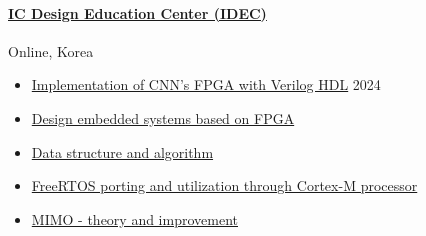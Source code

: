 \documentclass[a4paper,9pt]{extarticle}
\begin{document}
\paragraph{\large{\href{https://www.idec.or.kr/main/}{IC Design Education Center (IDEC)}}}  \hfill Online, Korea
\begin{itemize}
    \item \href{https://github.com/user-attachments/assets/234ad610-a051-4140-9f20-48ca4d8e4d42}{Implementation of CNN's FPGA with Verilog HDL}                         \hfill 2024
    \item \href{https://github.com/user-attachments/assets/68b0ae05-462b-4750-93ba-1bc4072dab66}{Design embedded systems based on FPGA}
    \item \href{https://github.com/user-attachments/assets/8fbda935-4b41-44f7-b83a-8d284f003168}{Data structure and algorithm}                                          
    \item \href{https://github.com/user-attachments/assets/805bbc13-3e6e-43d6-af75-df31f728d607}{FreeRTOS porting and utilization through Cortex-M processor}           
    \item \href{https://github.com/user-attachments/assets/707a4f8e-3b5a-4246-a763-81e2729f9cb2}{MIMO - theory and improvement}                                         
\end{itemize}
\end{document}
